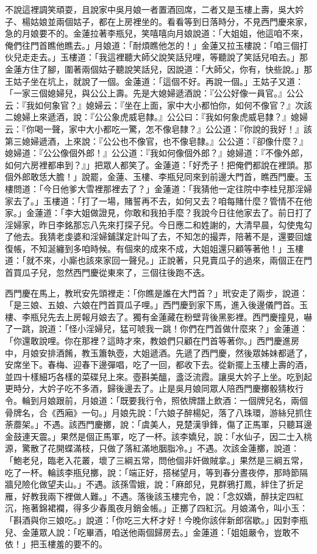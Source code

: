 不說這裡調笑頑耍，且說家中吳月娘一者置酒回席，二者又是玉樓上壽，吳大妗子、楊姑娘並兩個姑子，都在上房裡坐的。看看等到日落時分，不見西門慶來家，急的月娘要不的。金蓮拉著李瓶兒，笑嘻嘻向月娘說道：「大姐姐，他這咱不來，俺們往門首瞧他瞧去。」月娘道：「耐煩瞧他怎的！」金蓮又拉玉樓說：「咱三個打伙兒走走去。」玉樓道：「我這裡聽大師父說笑話兒哩，等聽說了笑話兒咱去。」那金蓮方住了腳，圍著兩個姑子聽說笑話兒，因說道：「大師父，你有，快些說。」那王姑子坐在坑上，就說了一個。金蓮道：「這個不好。再說一個。」王姑子又道：「一家三個媳婦兒，與公公上壽。先是大媳婦遞酒說：『公公好像一員官。』公公云：『我如何象官？』媳婦云：『坐在上面，家中大小都怕你，如何不像官？』次該二媳婦上來遞酒，說：『公公象虎威皂隸。』公公曰：『我如何象虎威皂隸？』媳婦云：『你喝一聲，家中大小都吃一驚，怎不像皂隸？』公公道：『你說的我好！』該第三媳婦遞酒，上來說：『公公也不像官，也不像皂隸。』公公道：『卻像什麼？』媳婦道：『公公像個外郎！』公公道：『我如何像個外郎？』媳婦道：『不像外郎，如何六房裡都串到？』」把眾人都笑了。金蓮道：「好禿子！把俺們都說在裡頭。那個外郎敢恁大膽！」說罷，金蓮、玉樓、李瓶兒同來到前邊大門首，瞧西門慶。玉樓問道：「今日他爹大雪裡那裡去了？」金蓮道：「我猜他一定往院中李桂兒那淫婦家去了。」玉樓道：「打了一場，賭誓再不去，如何又去？咱每賭什麼？管情不在他家。」金蓮道：「李大姐做證見，你敢和我拍手麼？我說今日往他家去了。前日打了淫婦家，昨日李銘那忘八先來打探子兒。今日應二和姓謝的，大清早晨，勾使鬼勾了他去。我猜老虔婆和淫婦鋪謀定計叫了去，不知怎的撮弄，陪著不是，還要回爐復帳，不知涎纏到多咱時候。有個來的成來不成，大姐姐還只顧等著他！」玉樓道：「就不來，小廝也該來家回一聲兒。」正說著，只見賣瓜子的過來，兩個正在門首買瓜子兒，忽然西門慶從東來了，三個往後跑不迭。

西門慶在馬上，教玳安先頭裡走：「你瞧是誰在大門首？」玳安走了兩步，說道：「是三娘、五娘、六娘在門首買瓜子哩。」西門慶到家下馬，進入後邊儀門首。玉樓、李瓶兒先去上房報月娘去了。獨有金蓮藏在粉壁背後黑影裡。西門慶撞見，嚇了一跳，說道：「怪小淫婦兒，猛可唬我一跳！你們在門首做什麼來？」金蓮道： 「你還敢說哩。你在那裡？這時才來，教娘們只顧在門首等著你。」西門慶進房中，月娘安排酒餚，教玉簫執壺，大姐遞酒。先遞了西門慶，然後眾姊妹都遞了，安席坐下。春梅、迎春下邊彈唱，吃了一回，都收下去。從新擺上玉樓上壽的酒，並四十樣細巧各樣的菜碟兒上來。壺斟美醞，盞泛流霞。讓吳大妗子上坐。吃到起更時分，大妗子吃不多酒，歸後邊去了。止是吳月娘同眾人陪西門慶擲骰猜枚行令。輪到月娘跟前，月娘道：「既要我行令，照依牌譜上飲酒：一個牌兒名，兩個骨牌名，合《西廂》一句。」月娘先說：「六娘子醉楊妃，落了八珠環，游絲兒抓住荼蘼架。」不遇。該西門慶擲，說：「虞美人，見楚漢爭鋒，傷了正馬軍，只聽耳邊金鼓連天震。」果然是個正馬軍，吃了一杯。該李嬌兒，說：「水仙子，因二士入桃源，驚散了花開蝶滿枝，只做了落紅滿地胭脂冷。」不遇。次該金蓮擲，說道： 「鮑老兒，臨老入花叢，壞了三綱五常，問他個非奸做賊拿。」果然是三綱五常，吃了一杯。輪該李瓶兒擲，說：「端正好，搭梯望月，等到春分晝夜停，那時節隔牆兒險化做望夫山。」不遇。該孫雪娥，說：「麻郎兒，見群鴉打鳳，絆住了折足雁，好教我兩下裡做人難。」不遇。落後該玉樓完令，說：「念奴嬌，醉扶定四紅沉，拖著錦裙襴，得多少春風夜月銷金帳。」正擲了四紅沉。月娘滿令，叫小玉：「斟酒與你三娘吃。」說道：「你吃三大杯才好！今晚你該伴新郎宿歇。」因對李瓶兒、金蓮眾人說：「吃畢酒，咱送他兩個歸房去。」金蓮道：「姐姐嚴令，豈敢不依！」把玉樓羞的要不的。

